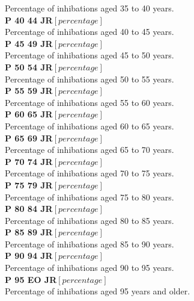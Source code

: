 Percentage of inhibations aged 35 to 40 years. \\
\textbf{P 40 44 JR}$ [percentage]$ \\
Percentage of inhibations aged 40 to 45 years. \\
\textbf{P 45 49 JR}$ [percentage]$ \\
Percentage of inhibations aged 45 to 50 years. \\
\textbf{P 50 54 JR}$ [percentage]$ \\
Percentage of inhibations aged 50 to 55 years. \\
\textbf{P 55 59 JR}$ [percentage]$\\
Percentage of inhibations aged 55 to 60 years. \\
\textbf{P 60 65 JR}$ [percentage]$ \\
Percentage of inhibations aged 60 to 65 years.\\
\textbf{P 65 69 JR}$ [percentage]$ \\
Percentage of inhibations aged 65 to 70 years. \\
\textbf{P 70 74 JR}$ [percentage]$ \\
Percentage of inhibations aged 70 to 75 years. \\
\textbf{P 75 79 JR}$ [percentage]$ \\
Percentage of inhibations aged 75 to 80 years. \\
\textbf{P 80 84 JR}$ [percentage]$ \\
Percentage of inhibations aged 80 to 85 years. \\
\textbf{P 85 89 JR}$ [percentage]$ \\
Percentage of inhibations aged 85 to 90 years. \\
\textbf{P 90 94 JR}$ [percentage]$ \\
Percentage of inhibations aged 90 to 95 years. \\
\textbf{P 95 EO JR}$ [percentage]$ \\
Percentage of inhibations aged 95 years and older. \\